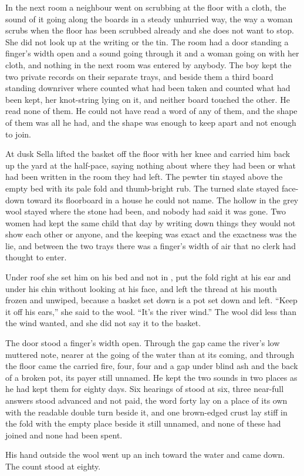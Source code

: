 In the next room a neighbour went on scrubbing at the floor with a cloth, the sound of it going along the boards in a steady unhurried way, the way a woman scrubs when the floor has been scrubbed already and she does not want to stop. She did not look up at the writing or the tin. The room had a door standing a finger's width open and a sound going through it and a woman going on with her cloth, and nothing in the next room was entered by anybody. The boy kept the two private records on their separate trays, and beside them a third board standing downriver where  counted what had been taken and  counted what had been kept, her knot-string lying on it, and neither board touched the other. He read none of them. He could not have read a word of any of them, and the shape of them was all he had, and the shape was enough to keep apart and not enough to join.

\scenebreak

At dusk Sella lifted the basket off the floor with her knee and carried him back up the yard at the half-pace, saying nothing about where they had been or what had been written in the room they had left. The pewter tin stayed above the empty bed with its pale fold and thumb-bright rub. The turned slate stayed face-down toward its floorboard in a house he could not name. The hollow in the grey wool stayed where the stone had been, and nobody had said it was gone. Two women had kept the same child that day by writing down things they would not show each other or anyone, and the keeping was exact and the exactness was the lie, and between the two trays there was a finger's width of air that no clerk had thought to enter.

Under  roof she set him on his bed and not in , put the fold right at his ear and under his chin without looking at his face, and left the thread at his mouth frozen and unwiped, because a basket set down is a pot set down and left. “Keep it off his ears,” she said to the wool. “It's the river wind.” The wool did less than the wind wanted, and she did not say it to the basket.

The door stood a finger's width open. Through the gap came the river's low muttered note, nearer at the going of the water than at its coming, and through the floor came the carried fire, four, four and a gap under blind ash and the back of a broken pot, its payer still unnamed. He kept the two sounds in two places as he had kept them for eighty days. Six hearings of  stood at six, three near-full answers stood advanced and not paid, the word forty lay on a place of its own with the readable double turn beside it, and one brown-edged crust lay stiff in the fold with the empty place beside it still unnamed, and none of these had joined and none had been spent.

His hand outside the wool went up an inch toward the water and came down. The count stood at eighty.
